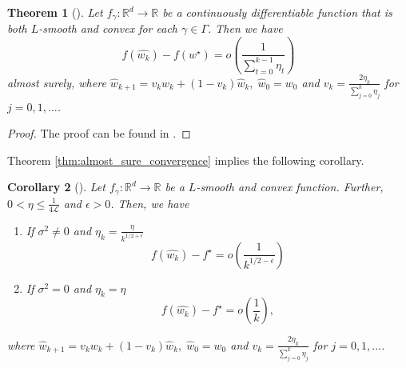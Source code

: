 \documentclass[12pt]{article}
\newtheorem{theorem}{Theorem}[section]
\newtheorem{corollary}[theorem]{Corollary}
\theoremstyle{definition}
\newtheorem{assumption}[assumption]{Assumption}
\numberwithin{equation}{section}
\newcommand{\R}{\mathbb{R}}
\newcommand{\CL}{\mathcal{L}}
\begin{document}
\begin{theorem}[]
  \label{thm:almost_sure_convergence}
  Let $f_{\gamma} : \R^d \rightarrow \R$ be a continuously differentiable function that is both $L$-smooth and convex for each $\gamma \in \Gamma$. Then we have 
  \begin{equation*}
    f(\widehat{w_{k}}) - f(w^\star) = o\left(\frac{1}{\sum_{t=0}^{k-1}\eta_t}\right)
  \end{equation*}
  almost surely, where $\widehat{w}_{k+1} = v_k w_k + (1-v_k)\widehat{w}_k, \; \widehat{w}_0 = w_0$ and $v_k = \frac{2\eta_k}{\sum_{j=0}^k\eta_j}$ for $j=0,1,\dots$.
\end{theorem}
\begin{proof}
  The proof can be found in \autocite{sebbouhAlmostSureConvergence2021}.
\end{proof}
Theorem \autoref{thm:almost_sure_convergence} implies the following corollary.
\begin{corollary}[]
  Let $f_{\gamma}: \R^d \rightarrow \R$ be a $L$-smooth and convex function. Further, $0 < \eta \leq \frac{1}{4\CL}$ and $\epsilon > 0 $. Then, we have
  \begin{enumerate}
    \item If $\sigma^2 \neq 0$ and $\eta_k = \frac{\eta}{k^{1/2+\epsilon}}$
    \begin{equation*}
      f(\widehat{w_{k}}) - f^\star = o\left(\frac{1}{k^{1/2-\epsilon}}\right)
    \end{equation*}
    \item If $\sigma^2 = 0$ and $\eta_k = \eta$
    \begin{equation*}
      f(\widehat{w_{k}}) - f^\star = o\left(\frac{1}{k}\right),
    \end{equation*}
  \end{enumerate}
  where $\widehat{w}_{k+1} = v_k w_k + (1-v_k)\widehat{w}_k, \; \widehat{w}_0 = w_0$ and $v_k = \frac{2\eta_k}{\sum_{j=0}^k\eta_j}$ for $j=0,1,\dots$.
\end{corollary}
\end{document}

